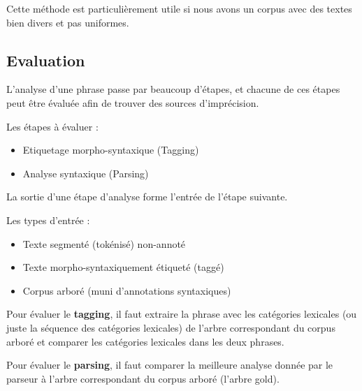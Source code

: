 \documentclass[12pt]{article}
\begin{document}
Cette m\'ethode est particuli\`erement utile si nous avons un corpus avec des
textes bien divers et pas uniformes.

\subsection{Evaluation}

L'analyse d'une phrase passe par beaucoup d'\'etapes, et chacune de ces \'etapes peut
\^etre \'evalu\'ee afin de trouver des sources d'impr\'ecision.\par

Les \'etapes \`a \'evaluer :
\begin{itemize}
\item Etiquetage morpho-syntaxique (Tagging)
\item Analyse syntaxique (Parsing)
\end{itemize}


La sortie d'une \'etape d'analyse forme l'entr\'ee de l'\'etape suivante.

Les types d'entr\'ee :
\begin{itemize}
\item Texte segment\'e (tok\'enis\'e) non-annot\'e
\item Texte morpho-syntaxiquement \'etiquet\'e (tagg\'e)
\item Corpus arbor\'e (muni d'annotations syntaxiques)
\end{itemize}

Pour \'evaluer le \textbf{tagging}, il faut extraire la phrase avec les cat\'egories
lexicales (ou juste la s\'equence des cat\'egories lexicales) de l'arbre
correspondant du corpus arbor\'e et comparer les cat\'egories lexicales dans les
deux phrases.\par

Pour \'evaluer le \textbf{parsing}, il faut comparer la meilleure analyse donn\'ee
par le parseur \`a l'arbre correspondant du corpus arbor\'e (l'arbre gold).
\end{document}
